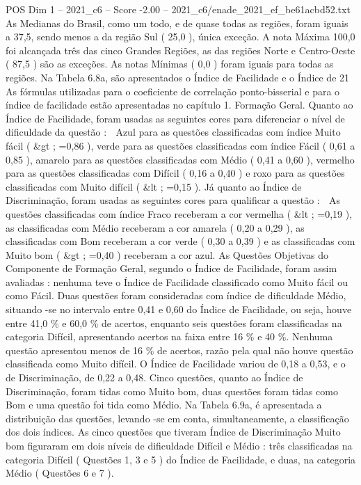 \begin{textsample}{POS Dim 1 – 2021\_c6 – Score -2.00 – 2021\_c6/enade\_2021\_ef\_be61acbd52.txt}
As Medianas do Brasil, como um todo, e de quase todas as regiões, foram iguais a 37,5, sendo menos a da região Sul ( 25,0 ), única exceção.
A nota Máxima 100,0 foi alcançada três das cinco Grandes Regiões, as das regiões Norte e Centro-Oeste ( 87,5 ) são as exceções.
As notas Mínimas ( 0,0 ) foram iguais para todas as regiões.
Na Tabela 6.8a, são apresentados o Índice de Facilidade e o Índice de 21 As fórmulas utilizadas para o coeficiente de correlação ponto-bisserial e para o índice de facilidade estão apresentadas no capítulo 1.
Formação Geral.
Quanto ao Índice de Facilidade, foram usadas as seguintes cores para diferenciar o nível de dificuldade da questão :  Azul para as questões classificadas com índice Muito fácil ( \&gt ; =0,86 ), verde para as questões classificadas com índice Fácil ( 0,61 a 0,85 ), amarelo para as questões classificadas com Médio ( 0,41 a 0,60 ), vermelho para as questões classificadas com Difícil ( 0,16 a 0,40 ) e roxo para as questões classificadas com Muito difícil ( \&lt ; =0,15 ).
Já quanto ao Índice de Discriminação, foram usadas as seguintes cores para qualificar a questão :  As questões classificadas com índice Fraco receberam a cor vermelha ( \&lt ; =0,19 ), as classificadas com Médio receberam a cor amarela ( 0,20 a 0,29 ), as classificadas com Bom receberam a cor verde ( 0,30 a 0,39 ) e as classificadas com Muito bom ( \&gt ; =0,40 ) receberam a cor azul.
As Questões Objetivas do Componente de Formação Geral, segundo o Índice de Facilidade, foram assim avaliadas : nenhuma teve o Índice de Facilidade classificado como Muito fácil ou como Fácil.
Duas questões foram consideradas com índice de dificuldade Médio, situando -se no intervalo entre 0,41 e 0,60 do Índice de Facilidade, ou seja, houve entre 41,0 \% e 60,0 \% de acertos, enquanto seis questões foram classificadas na categoria Difícil, apresentando acertos na faixa entre 16 \% e 40 \%.
Nenhuma questão apresentou menos de 16 \% de acertos, razão pela qual não houve questão classificada como Muito difícil.
O Índice de Facilidade variou de 0,18 a 0,53, e o de Discriminação, de 0,22 a 0,48.
Cinco questões, quanto ao Índice de Discriminação, foram tidas como Muito bom, duas questões foram tidas como Bom e uma questão foi tida como Médio.
Na Tabela 6.9a, é apresentada a distribuição das questões, levando -se em conta, simultaneamente, a classificação dos dois índices.
As cinco questões que tiveram Índice de Discriminação Muito bom figuraram em dois níveis de dificuldade Difícil e Médio : três classificadas na categoria Difícil ( Questões 1, 3 e 5 ) do Índice de Facilidade, e duas, na categoria Médio ( Questões 6 e 7 ).

\end{textsample}
